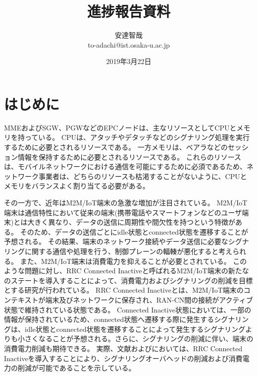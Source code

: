 \documentclass[a4j]{ujarticle}
\title{進捗報告資料}
\author{安達智哉\\to-adachi@ist.osaka-u.ac.jp}
\date{2019年3月22日}
\begin{document}
\maketitle



\section{はじめに}
  \label{sec:abs}
MMEおよびSGW、PGWなどのEPCノードは、主なリソースとしてCPUとメモリを持っている。
CPUは、アタッチやデタッチなどのシグナリング処理を実行するために必要とされるリソースである。
一方メモリは、ベアラなどのセッション情報を保持するために必要とされるリソースである。
これらのリソースは、モバイルネットワークにおける通信を可能にするために必須であるため、ネットワーク事業者は、どちらのリソースも枯渇することがないように、CPUとメモリをバランスよく割り当てる必要がある。

その一方で、近年はM2M/IoT端末の急激な増加が注目されている。
M2M/IoT端末は通信特性において従来の端末(携帯電話やスマートフォンなどのユーザ端末)とは大きく異なり、データの送信に周期性や間欠性を持つという特徴がある。
そのため、データの送信ごとにidle状態とconnected状態を遷移することが予想される。
その結果、端末のネットワーク接続やデータ送信に必要なシグナリングに関する通信や処理を行う、制御プレーンの輻輳が悪化すると考えられる。
また、M2M/IoT端末は消費電力を抑えることが必要とされている。
このような問題に対し、RRC Connected Inactiveと呼ばれるM2M/IoT端末の新たなのステートを導入することによって、消費電力およびシグナリングの削減を目標とする研究が行われている。
RRC Connected Inactiveとは、M2M/IoT端末のコンテキストが端末及びネットワークに保存され、RAN-CN間の接続がアクティブ状態で維持されている状態である。
Connected Inactive状態においては、一部の情報が保持されているため、connected状態へ遷移する際に発生するシグナリングは、idle状態とconnected状態を遷移することによって発生するシグナリングよりも小さくなることが予想される。さらに、シグナリングの削減に伴い、端末の消費電力削減も期待できる。
実際、文献\cite{RRCStateHandlingfor5G}および\cite{ANovelStateModelfor5GRadioAccessNetworks}においては、RRC Connected Inactiveを導入することにより、シグナリングオーバヘッドの削減および消費電力の削減が可能であることを示している。
\end{document}
